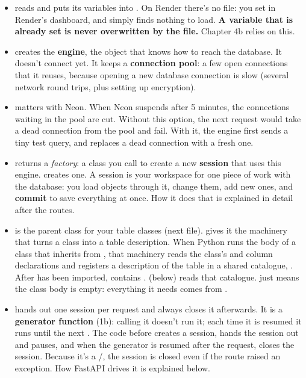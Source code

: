 \begin{itemize}
\item {} reads  and puts its variables into . On Render there's no  file: you set  in Render's dashboard, and  simply finds nothing to load. \textbf{A variable that is already set is never overwritten by the file.} Chapter 4b relies on this.
\item {} creates the \textbf{engine}, the object that knows how to reach the database. It doesn't connect yet. It keeps a \textbf{connection pool}: a few open connections that it reuses, because opening a new database connection is slow (several network round trips, plus setting up encryption).
\item {} matters with Neon. When Neon suspends after 5 minutes, the connections waiting in the pool are cut. Without this option, the next request would take a dead connection from the pool and fail. With it, the engine first sends a tiny test query, and replaces a dead connection with a fresh one.
\item {} returns a \emph{factory}: a class you call to create a new \textbf{session} that uses this engine.  creates one. A session is your workspace for one piece of work with the database: you load objects through it, change them, add new ones, and \textbf{commit} to save everything at once. How it does that is explained in detail after the routes.
\item {} is the parent class for your table classes (next file).  gives it the machinery that turns a class into a table description. When Python runs the body of a class that inherits from , that machinery reads the class's  and column declarations and registers a description of the table in a shared catalogue, . After  has been imported,  contains .  (below) reads that catalogue.  just means the class body is empty: everything it needs comes from .
\item {} hands out one session per request and always closes it afterwards. It is a \textbf{generator function} (1b): calling it doesn't run it; each time it is resumed it runs until the next . The code before  creates a session,  hands the session out and pauses, and when the generator is resumed after the request,  closes the session. Because it's a /, the session is closed even if the route raised an exception. How FastAPI drives it is explained below.
\end{itemize}

